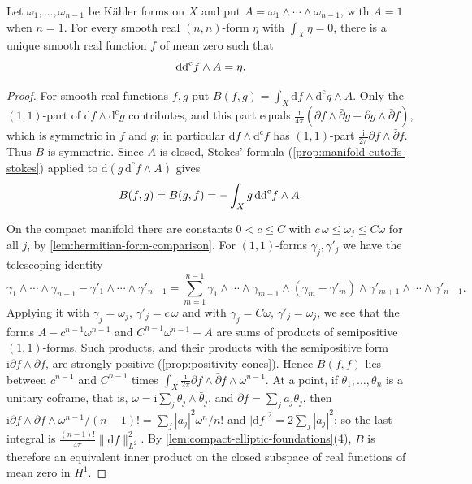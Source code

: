 \begin{lemma}\label{lem:mixed-scalar-poisson}
Let $\omega_1,\ldots,\omega_{n-1}$ be K\"ahler forms on $X$ and put $A=\omega_1\wedge\cdots\wedge\omega_{n-1}$, with $A=1$ when $n=1$. For every smooth real $(n,n)$-form $\eta$ with $\int_X\eta=0$, there is a unique smooth real function $f$ of mean zero such that
\[
 \mathrm{dd}^{\mathrm{c}} f\wedge A=\eta.
\]
\end{lemma}
\begin{proof}
For smooth real functions $f,g$ put $B(f,g)=\int_X\mathrm{d}f\wedge\mathrm{d}^{\mathrm c}g\wedge A$. Only the $(1,1)$-part of $\mathrm df\wedge\mathrm d^{\mathrm c}g$ contributes, and this part equals $\frac{\mathrm i}{4\pi}(\partial f\wedge\bar\partial g+\partial g\wedge\bar\partial f)$, which is symmetric in $f$ and $g$; in particular $\mathrm{d}f\wedge\mathrm{d}^{\mathrm c}f$ has $(1,1)$-part $\frac{\mathrm i}{2\pi}\partial f\wedge\bar\partial f$. Thus $B$ is symmetric. Since $A$ is closed, Stokes' formula (\cref{prop:manifold-cutoffs-stokes}) applied to $\mathrm d(g\,\mathrm d^{\mathrm c}f\wedge A)$ gives
\[
 B(f,g)=B(g,f)=-\int_Xg\,\mathrm{dd}^{\mathrm{c}} f\wedge A.
\]

On the compact manifold there are constants $0<c\leq C$ with $c\,\omega\leq\omega_j\leq C\omega$ for all $j$, by \cref{lem:hermitian-form-comparison}. For $(1,1)$-forms $\gamma_j,\gamma'_j$ we have the telescoping identity
\begin{equation}\label{eq:wedge-product-telescoping}
 \gamma_1\wedge\cdots\wedge\gamma_{n-1}-\gamma'_1\wedge\cdots\wedge\gamma'_{n-1}=\sum_{m=1}^{n-1}\gamma_1\wedge\cdots\wedge\gamma_{m-1}\wedge(\gamma_m-\gamma'_m)\wedge\gamma'_{m+1}\wedge\cdots\wedge\gamma'_{n-1}.
\end{equation}
Applying it with $\gamma_j=\omega_j$, $\gamma'_j=c\,\omega$ and with $\gamma_j=C\omega$, $\gamma'_j=\omega_j$, we see that the forms $A-c^{n-1}\omega^{n-1}$ and $C^{n-1}\omega^{n-1}-A$ are sums of products of semipositive $(1,1)$-forms. Such products, and their products with the semipositive form $\mathrm i\partial f\wedge\bar\partial f$, are strongly positive (\cref{prop:positivity-cones}). Hence $B(f,f)$ lies between $c^{n-1}$ and $C^{n-1}$ times $\int_X\frac{\mathrm i}{2\pi}\partial f\wedge\bar\partial f\wedge\omega^{n-1}$. At a point, if $\theta_1,\ldots,\theta_n$ is a unitary coframe, that is, $\omega=\mathrm i\sum_j\theta_j\wedge\bar\theta_j$, and $\partial f=\sum_ja_j\theta_j$, then $\mathrm i\partial f\wedge\bar\partial f\wedge\omega^{n-1}/(n-1)!=\sum_j|a_j|^2\omega^n/n!$ and $|\mathrm df|^2=2\sum_j|a_j|^2$; so the last integral is $\frac{(n-1)!}{4\pi}\|\mathrm df\|_{L^2}^2$. By \cref{lem:compact-elliptic-foundations}(4), $B$ is therefore an equivalent inner product on the closed subspace of real functions of mean zero in $H^1$.


\end{proof}
